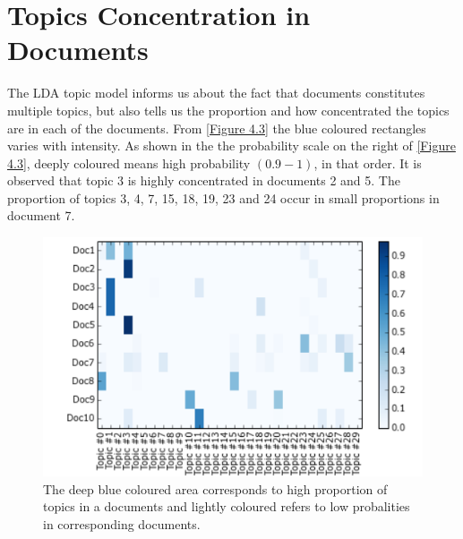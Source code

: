 \section{Topics Concentration in Documents}
The LDA topic model informs us about the fact that documents constitutes multiple topics, but also tells us the proportion and how concentrated the topics are in each of the documents. From \eqref{Figure 4.3} the blue coloured rectangles varies with intensity. As shown in the the probability scale on the right of \eqref{Figure 4.3}, deeply coloured means high probability $(0.9-1)$, in that order. It is observed that topic 3 is highly concentrated in documents 2 and 5. The proportion of topics 3, 4, 7, 15, 18, 19, 23 and 24 occur in small proportions in document 7.
\begin{figure}[hbtp]
\centering
\includegraphics[scale=0.85]{c4_4.png}
\caption{The deep blue coloured  area corresponds to high proportion of topics in a documents and lightly coloured refers to low probalities in corresponding documents.}\label{Figure 4.3}
\end{figure}
\newpage
